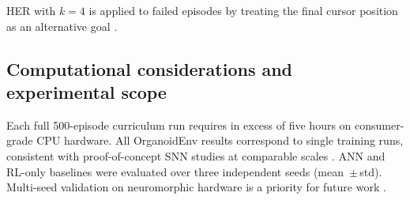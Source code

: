 \documentclass[journal,twocolumn]{IEEEtran}
\begin{document}
HER with $k=4$ is applied to failed episodes by treating the final
cursor position as an alternative goal \cite{Andrychowicz2017HER}.

\subsection{Computational considerations and experimental
scope}\label{sec:compute}

Each full 500-episode curriculum run requires in excess of five hours
on consumer-grade CPU hardware.  All OrganoidEnv results correspond to
single training runs, consistent with proof-of-concept SNN studies at
comparable scales \cite{Florian2007rstdp,AcetylcholineNav2018}.
ANN and RL-only baselines were evaluated over three independent seeds
(mean~$\pm$\,std).  Multi-seed validation on neuromorphic hardware is
a priority for future work \cite{Davies2024Loihi}.
\end{document}
